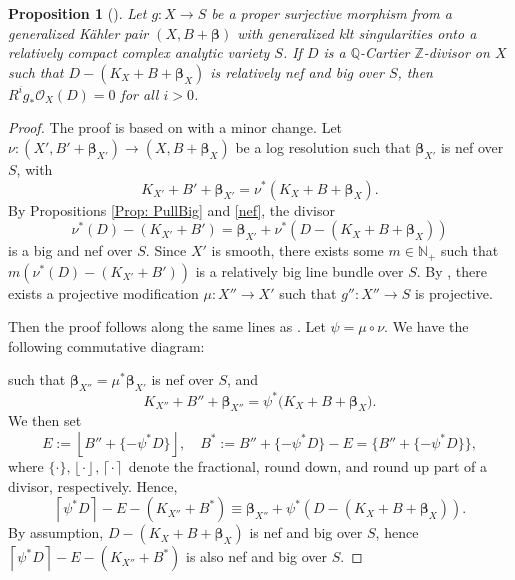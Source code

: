 \documentclass[12pt]{amsart}
\numberwithin{equation}{section}
\newtheorem{proposition}[theorem]{Proposition}
\theoremstyle{definition}
\theoremstyle{plain}
\newtheorem*{thm A*}{Theorem A}
\newtheorem*{thm B*}{Theorem B}
\newtheorem*{thm C*}{Theorem C}
\newtheorem*{thm D*}{Theorem D}
\theoremstyle{definition}
\renewcommand{\1}{\mathds{1}}
\newcommand{\bbeta}{\boldsymbol{\beta}}
\renewcommand{\>}{\rightarrow}
\begin{document}
\begin{proposition}[{\cite[Lemma 5.1]{DH24}}]\label{KVVanishing}
Let $g: X \rightarrow S$ be a proper surjective morphism from a generalized K\"ahler pair $(X, B+ {\boldsymbol{\beta}})$ with generalized klt singularities onto a relatively compact complex analytic variety $S$. If $D$ is a $\mathbb{Q}$-Cartier $\mathbb{Z}$-divisor on $X$ such that $D-\left(K_X+B+ { {\bbeta}}_X\right)$ is relatively nef and big over $S$, then $R^i g_* \mathcal{O}_X(D)=0$ for all $i>0$.
\end{proposition}
\begin{proof}
The proof is based on \cite[Lemma 5.1]{DH24} with a minor change. Let $\nu:(X',B'+{\boldsymbol{\beta}}_{X'})\to (X,B+{\boldsymbol{\beta}}_X)$ be a log resolution such that ${\boldsymbol{\beta}}_{X'}$ is nef over $S$, with 
$$
K_{X'}+B'+\boldsymbol{\beta}_{X'}=\nu^*(K_X+B+\boldsymbol{\beta}_X).
$$
By Propositions \ref{Prop: PullBig} and \ref{nef}, the divisor
$$
 \nu^*(D) - (K_{X'}+B')=\boldsymbol{\beta}_{X'} + \nu^*(D - (K_X+B+\boldsymbol{\beta}_X)) 
$$
is a big and nef over $S$. Since $X'$ is smooth, there exists some $m\in \mathbb{N}_{+}$ such that $m(\nu^*(D) - (K_{X'}+B'))$ is a relatively big line bundle over $S$. By \cite[Lemma 2.18]{DH24}, there exists a projective modification $\mu:X'' \to X'$ such that $g'':X'' \to S$ is projective.

Then the proof follows along the same lines as \cite[Lemma~5.1]{DH24}. 
Let $\psi = \mu \circ \nu$. We have the following commutative diagram:
\begin{center}
\end{center}
such that $\boldsymbol{\beta}_{X''} = \mu^*\boldsymbol{\beta}_{X'}$ is nef over $S$, and
\[
K_{X''} + B'' + \boldsymbol{\beta}_{X''}
= \psi^*\bigl(K_X + B + \boldsymbol{\beta}_X\bigr).
\]
We then set 
$$
E := \left\lfloor B'' + \{-\psi^*D\} \right\rfloor, \quad B^* := B'' + \{-\psi^*D\} - E = \{B'' + \{-\psi^*D\}\},
$$ 
where $\{\cdot\},\left\lfloor\cdot\right\rfloor,\left\lceil\cdot\right\rceil $ denote the fractional, round down, and round up part of a divisor, respectively. Hence, 
$$
\left\lceil\psi^*D\right\rceil - E - (K_{X''}+B^*) \equiv \boldsymbol{\beta}_{X''} + \psi^*\left(D - (K_X+B+\boldsymbol{\beta}_X)\right).
$$
By assumption, $D-(K_X +B + \boldsymbol{\beta}_X)$ is nef and big over $S$, hence $\left\lceil\psi^*D\right\rceil - E - (K_{X''}+B^*)$ is also nef and big over $S$. 


\end{proof}
\end{document}
